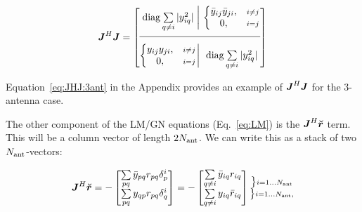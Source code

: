 \documentclass[useAMS,usenatbib]{mn2e}
\newcommand{\mat}[1]{{\bmath{#1}}}
\newcommand{\JJ}{\mat{J}} %
\begin{document}
\begin{equation}
\label{eq:JHJ:DI}
\JJ^H \JJ = 
\JHJblocksFull{
\mathrm{diag} \sum\limits_{q\ne i} |y_{iq}^2| 
}{
  \left \{ 
  \begin{array}{@{}cc@{}}
   \bar{y}_{ij} \bar{y}_{ji}, &{\scriptstyle i\ne j} \\
   0, &{\scriptstyle i=j}
  \end{array} \right .
}{
  \left \{ 
  \begin{array}{@{}cc@{}}
   y_{ij}y_{ji},&{\scriptstyle i\ne j} \\
   0, &{\scriptstyle i=j}
  \end{array} \right . 
}{
  \mathrm{diag} \sum\limits_{q\ne i} |y^2_{iq}| 
}
\end{equation}

Equation~\ref{eq:JHJ:3ant} in the Appendix provides an example of $\JJ^H\JJ$ for the 3-antenna case. 

\newcommand{\yysq}[2]{{y^2_{#1}+y^2_{#2}}}
\newcommand{\bb}[2]{{\bar{y}_{#1#2}\bar{y}_{#2#1}}}
\newcommand{\bbb}[2]{y_{#1#2}y_{#2#1}}

The other component of the LM/GN equations (Eq.~\ref{eq:LM}) is the $\JJ^H\Rr$ term. This will be a column vector of length $2N_\mathrm{ant}$. We can write this as a stack of two $N_\mathrm{ant}$-vectors:


\begin{equation}
\label{eq:JHR:DI}
\JJ^H\Rr = -\Matrix{c}{ 
\sum\limits_{pq} \bar{y}_{pq} r_{pq} \delta^{i}_p  \\
\sum\limits_{pq} y_{qp} r_{pq} \delta^{i}_q 
} = -\Matrix{c}{
\sum\limits_{q\ne i} \bar{y}_{iq} r_{iq}   \\
\sum\limits_{q\ne i} y_{iq} \bar{r}_{iq}  
}
\Stack{
\big \} \scriptstyle i=1\dots \Na \\ 
\big \} \scriptstyle i=1\dots \Na,
}
\end{equation}
\end{document}

